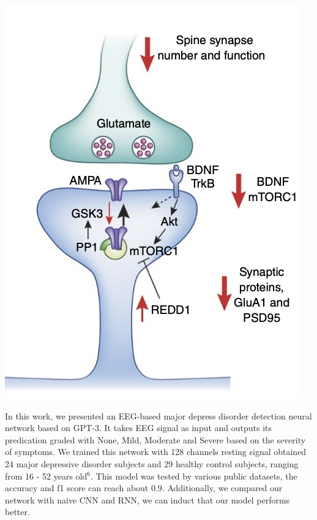 \documentclass[a0,portrait]{a0poster}
\begin{document}
\begin{minipage}[c]{\linewidth}
\begin{framed}
\begin{multicols}{2}
\begin{center}
\includegraphics[trim={0 0.9cm 0 0},clip,width=0.49\linewidth]{figures/abnormal}
\label{IGSMap}
\end{center}
In this work, we presented an EEG-based major depress disorder detection neural network based on GPT-3. It takes EEG signal as input and outputs its predication graded with None, Mild, Moderate and Severe based on the severity of symptoms. We trained this network with 128 channels resting signal obtained 24 major depressive disorder subjects and 29 healthy control subjects, ranging from 16 - 52 years old$^6$. This model was tested by various public datasets, the accuracy and f1 score can reach about 0.9. Additionally, we compared our network with naive CNN and RNN, we can induct that our model performs better.
\color{Black}

\end{multicols}
\end{framed}
\end{minipage}
\end{document}
